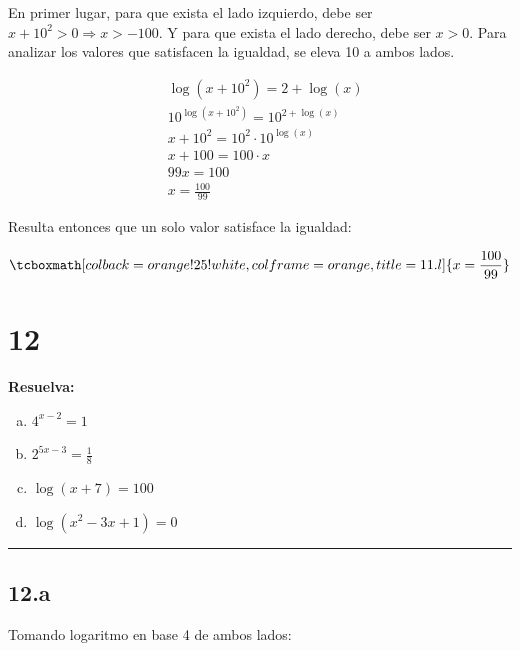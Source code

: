 \documentclass{article}
\newcommand{\hresult}[2]{\tcboxmath[colback=orange!25!white,colframe=orange, title=#1] {#2} }
\begin{document}
En primer lugar, para que exista el lado izquierdo, debe ser $ x + 10^2 > 0 \Rightarrow x > -100 $. Y para que exista el lado derecho, debe ser $ x > 0 $. Para analizar los valores que satisfacen la igualdad, se eleva 10 a ambos lados.

\begin{subequations}
\begin{align}
& \log( x + 10^2 ) = 2 + \log(x) \\
& 10^{ \log( x + 10^2 ) } = 10^{ 2 + \log(x) } \\
& x + 10^2 = 10^2 \cdot 10^{ \log(x) } \\
& x + 100 = 100 \cdot x \\
& 99x = 100 \\
& x = \frac{100}{99}
\end{align}
\end{subequations}

Resulta entonces que un solo valor satisface la igualdad:

\begin{equation}
\hresult{11.l}{ x = \frac{100}{99} }
\end{equation}

\section*{12}
\label{sec:12}

\textbf{Resuelva:}

\begin{enumerate}[(a)]
\bfseries

\item $ 4^{x-2} = 1 $

\item $ 2^{5x-3} = \frac{1}{8} $

\item $ \log(x + 7) = 100 $

\item $ \log(x^2 -3x + 1) = 0 $

\end{enumerate}
\hrule

\subsection*{12.a}
\label{subsec:12.a}

Tomando logaritmo en base 4 de ambos lados:
\end{document}
